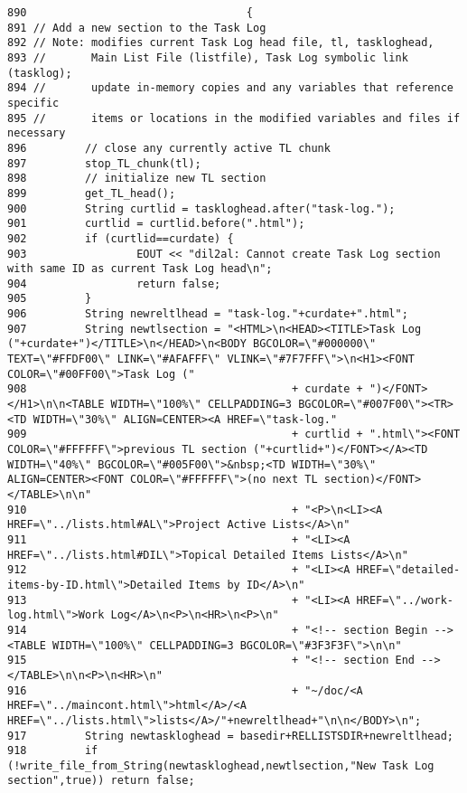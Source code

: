 \footnotesize\begin{verbatim}890                                  {
891 // Add a new section to the Task Log
892 // Note: modifies current Task Log head file, tl, taskloghead,
893 //       Main List File (listfile), Task Log symbolic link (tasklog);
894 //       update in-memory copies and any variables that reference specific
895 //       items or locations in the modified variables and files if necessary
896         // close any currently active TL chunk
897         stop_TL_chunk(tl);
898         // initialize new TL section
899         get_TL_head();
900         String curtlid = taskloghead.after("task-log.");
901         curtlid = curtlid.before(".html");
902         if (curtlid==curdate) {
903                 EOUT << "dil2al: Cannot create Task Log section with same ID as current Task Log head\n";
904                 return false;
905         }
906         String newreltlhead = "task-log."+curdate+".html";
907         String newtlsection = "<HTML>\n<HEAD><TITLE>Task Log ("+curdate+")</TITLE>\n</HEAD>\n<BODY BGCOLOR=\"#000000\" TEXT=\"#FFDF00\" LINK=\"#AFAFFF\" VLINK=\"#7F7FFF\">\n<H1><FONT COLOR=\"#00FF00\">Task Log ("
908                                         + curdate + ")</FONT></H1>\n\n<TABLE WIDTH=\"100%\" CELLPADDING=3 BGCOLOR=\"#007F00\"><TR><TD WIDTH=\"30%\" ALIGN=CENTER><A HREF=\"task-log."
909                                         + curtlid + ".html\"><FONT COLOR=\"#FFFFFF\">previous TL section ("+curtlid+")</FONT></A><TD WIDTH=\"40%\" BGCOLOR=\"#005F00\">&nbsp;<TD WIDTH=\"30%\" ALIGN=CENTER><FONT COLOR=\"#FFFFFF\">(no next TL section)</FONT></TABLE>\n\n"
910                                         + "<P>\n<LI><A HREF=\"../lists.html#AL\">Project Active Lists</A>\n"
911                                         + "<LI><A HREF=\"../lists.html#DIL\">Topical Detailed Items Lists</A>\n"
912                                         + "<LI><A HREF=\"detailed-items-by-ID.html\">Detailed Items by ID</A>\n"
913                                         + "<LI><A HREF=\"../work-log.html\">Work Log</A>\n<P>\n<HR>\n<P>\n"
914                                         + "<!-- section Begin --><TABLE WIDTH=\"100%\" CELLPADDING=3 BGCOLOR=\"#3F3F3F\">\n\n"
915                                         + "<!-- section End --></TABLE>\n\n<P>\n<HR>\n"
916                                         + "~/doc/<A HREF=\"../maincont.html\">html</A>/<A HREF=\"../lists.html\">lists</A>/"+newreltlhead+"\n\n</BODY>\n";
917         String newtaskloghead = basedir+RELLISTSDIR+newreltlhead;
918         if (!write_file_from_String(newtaskloghead,newtlsection,"New Task Log section",true)) return false;

\end{verbatim}
